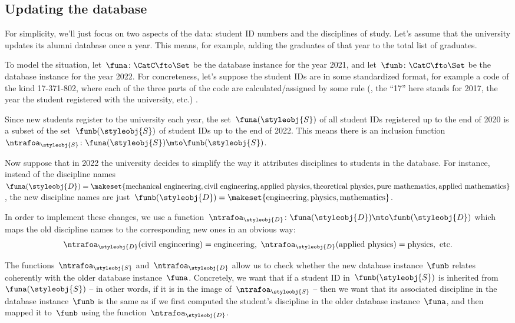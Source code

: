 \subsection{Updating the database}

For simplicity, we'll just focus on two aspects of the data: student ID numbers and the disciplines of study.
Let's assume that the university updates its alumni database once a year.
This means, for example, adding the graduates of that year to the total list of graduates.

To model the situation, let~$\funa \colon \CatC \fto \Set$ be the database instance for the year 2021, and let~$\funb \colon \CatC \fto \Set$ be the database instance for the year 2022.
For concreteness, let's suppose the student IDs are in some standardized format, for example a code of the kind 17-371-802, where each of the three parts of the code are calculated/assigned by some rule (, the ``17'' here stands for 2017, the year the student registered with the university, etc.)
.

Since new students register to the university each year, the set~$\funa(\styleobj{S})$ of all student IDs registered up to the end of 2020 is a subset of the set~$\funb(\styleobj{S})$ of student IDs up to the end of 2022.
This means there is an inclusion function~$\ntrafoa_{\styleobj{S}} \colon  \funa(\styleobj{S}) \mto \funb(\styleobj{S})$.

Now suppose that in 2022 the university decides to simplify the way it attributes disciplines to students in the database.
For instance, instead of the discipline names~$\funa(\styleobj{D}) = \makeset{ \text{mechanical engineering},  \text{civil engineering}, \text{applied physics}, \text{theoretical physics}, \text{pure mathematics}, \text{applied mathematics} }$,
the new discipline names are just~$\funb(\styleobj{D}) = \makeset{ \text{engineering}, \text{physics}, \text{mathematics} }$.

In order to implement these changes, we use a function~$\ntrafoa_{\styleobj{D}}\colon \funa(\styleobj{D}) \mto \funb(\styleobj{D})$ which maps the old discipline names to the corresponding new ones in an obvious way:
\begin{equation*}
    \ntrafoa_{\styleobj{D}}(\text{civil engineering}) = \text{engineering}, \ \ntrafoa_{\styleobj{D}}(\text{applied physics}) = \text{physics}, \ \text{etc.}
\end{equation*}

The functions~$\ntrafoa_\styleobj{S}$ and~$\ntrafoa_\styleobj{D}$ allow us to check whether the new database instance~$\funb$ relates coherently with the older database instance~$\funa$.
Concretely, we want that if a student ID in~$\funb(\styleobj{S})$ is inherited from~$\funa(\styleobj{S})$ -- in other words, if it is in the image of~$\ntrafoa_{\styleobj{S}}$ --  then we want that its associated discipline in the database instance~$\funb$ is the same as if we first computed the student's discipline in the older database instance~$\funa$, and then mapped it to~$\funb$ using the function~$\ntrafoa_{\styleobj{D}}$.

